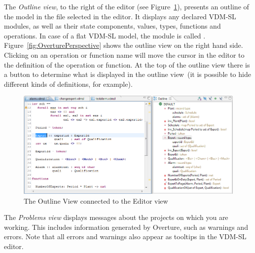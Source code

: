%
The \emph{Outline view}, to the right of the editor (see Figure~\ref{fig:OutlineView}), presents an outline of the model in the file selected in the editor. It displays any declared VDM-SL modules, as well as their state components, values, types, functions and operations. In case of a flat VDM-SL model, the module is called {}.  Figure~\ref{fig:OverturePerspective} shows the outline view on the right hand side. Clicking on an operation or function name will move the cursor in the editor to the definition of the operation or function. At the top of the outline view there is a button to determine what is displayed in the outline view~(it is possible to hide different kinds of definitions, for example).
%
\begin{figure}[!htb]
\begin{center}
  \includegraphics[width=4.5in]{figures/OutlineView}
  \caption[labelInTOC]{The Outline View connected to the Editor view}
  \label{fig:OutlineView}
\end{center}
\end{figure}
%
The \emph{Problems view} displays messages about the projects on which you are working. This includes information generated by Overture, such as warnings and errors. Note that all errors and warnings also appear as tooltips in the VDM-SL editor.

